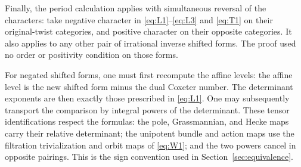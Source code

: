 Finally, the period calculation applies with simultaneous reversal of the
characters: take negative character in \eqref{eq:L1}--\eqref{eq:L3} and
\eqref{eq:T1} on their original-twist categories, and positive character
on their opposite categories.  It also applies to any other pair of
irrational inverse shifted forms.  The proof used no order or positivity
condition on those forms.

For negated shifted forms, one must first recompute the affine levels:
the affine level is the new shifted form minus the dual Coxeter number.
The determinant exponents are then exactly those prescribed in
\eqref{eq:L1}.  One may subsequently transport the comparison by integral
powers of the determinant.  These tensor identifications respect the
formulas: the pole, Grassmannian, and Hecke maps carry their relative
determinant; the unipotent bundle and action maps use the filtration
trivialization and orbit maps of \eqref{eq:W1}; and the two powers cancel
in opposite pairings.  This is the sign convention used in
Section~\ref{sec:equivalence}.
